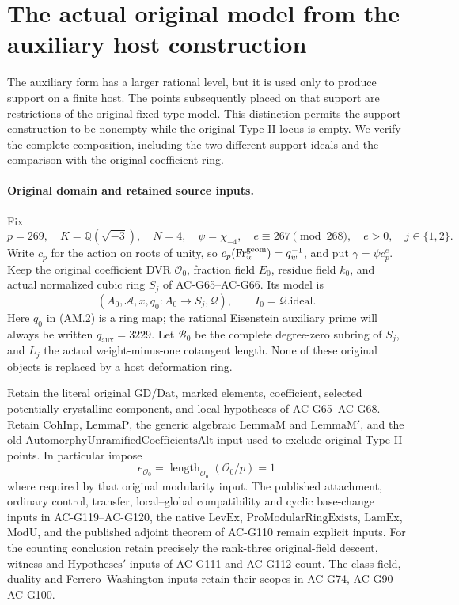 \section{The actual original model from the auxiliary host construction}
\label{sec:cubic-auxiliary-actual-model}

The auxiliary form has a larger rational level, but it is used only to
produce support on a finite host.  The points subsequently placed on
that support are restrictions of the original fixed-type model.
This distinction permits the support construction to be nonempty
while the original Type II locus is empty.  We verify the complete
composition, including the two different support ideals and the
comparison with the original coefficient ring.

\paragraph{Original domain and retained source inputs.}
Fix
\[
 p=269,\quad K=\mathbb Q(\sqrt{-3}),\quad N=4,\quad
 \psi=\chi_{-4},\quad e\equiv267\pmod {268},\quad e>0,\quad
 j\in\{1,2\}.
 \tag{AM.1}
\]
Write \(c_p\) for the action on roots of unity, so
\(c_p(\operatorname{Fr}^{\rm geom}_w)=q_w^{-1}\), and put
\(\gamma=\psi c_p^e\).
Keep the original coefficient DVR \(\mathcal O_0\), fraction
field \(E_0\), residue field \(k_0\), and actual normalized
cubic ring \(S_j\) of AC-G65--AC-G66.  Its model is
\[
 (A_0,\mathcal A,x,q_0:A_0\longrightarrow S_j,\mathcal Q),
 \qquad I_0=\mathcal Q.\mathrm{ideal}.
 \tag{AM.2}
\]
Here \(q_0\) in (AM.2) is a ring map; the rational Eisenstein
auxiliary prime will always be written \(q_{\mathrm{aux}}=3229\).
Let \(\mathscr B_0\) be the complete degree-zero subring of
\(S_j\), and \(L_j\) the actual weight-minus-one cotangent
length.  None of these original objects is replaced by a
host deformation ring.

Retain the literal original \(\mathrm{GD}/\mathrm{Dat}\), marked
elements, coefficient, selected potentially crystalline component,
and local hypotheses of AC-G65--AC-G68.  Retain
\(\mathrm{CohInp}\), \(\mathrm{LemmaP}\), the generic algebraic
\(\mathrm{LemmaM}\) and \(\mathrm{LemmaM'}\), and the old
\(\mathrm{AutomorphyUnramifiedCoefficientsAlt}\) input used to
exclude original Type II points.  In particular impose
\[
                   e_{\mathcal O_0}
       =\operatorname{length}_{\mathcal O_0}(\mathcal O_0/p)=1
 \tag{AM.3}
\]
where required by that original modularity input.
The published attachment, ordinary control, transfer, local--global
compatibility and cyclic base-change inputs in AC-G119--AC-G120,
the native \(\mathrm{LevEx}\), \(\mathrm{ProModularRingExists}\),
\(\mathrm{LamEx}\), \(\mathrm{ModU}\), and the published
adjoint theorem of AC-G110 remain explicit inputs.
For the counting conclusion retain precisely the rank-three
original-field descent, witness and \(\mathrm{Hypotheses'}\)
inputs of AC-G111 and AC-G112-count.
The class-field, duality and Ferrero--Washington inputs retain
their scopes in AC-G74, AC-G90--AC-G100.


